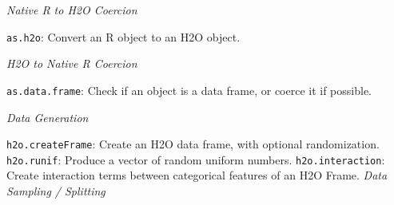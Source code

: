 {\emph{Native R to H2O Coercion}}\par
 {\texttt{as.h2o}}: Convert an R object to an H2O object.\newline


\emph{H2O to Native R Coercion}\par
{\texttt{as.data.frame}}: Check if an object is a data frame, or coerce it if possible.\newline

\emph{Data Generation}\par
{\texttt{h2o.createFrame}}: Create an H2O data frame, with optional randomization.\newline
{\texttt{h2o.runif}}: Produce a vector of random uniform numbers.\newline
{\texttt{h2o.interaction}}: Create interaction terms between categorical features of an H2O Frame.\newline
\emph{Data Sampling / Splitting}\par

